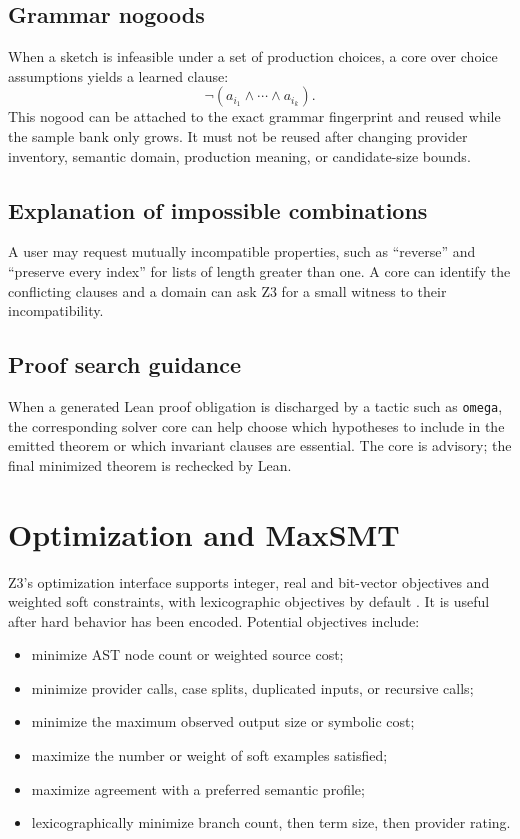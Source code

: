 \documentclass[11pt,oneside]{report}
\newcommand{\code}[1]{\texttt{#1}}
\begin{document}
\subsection{Grammar nogoods}

When a sketch is infeasible under a set of production choices, a core over choice assumptions yields a learned clause:
\[
  \neg(a_{i_1}\land\cdots\land a_{i_k}).
\]
This nogood can be attached to the exact grammar fingerprint and reused while the sample bank only grows. It must not be reused after changing provider inventory, semantic domain, production meaning, or candidate-size bounds.

\subsection{Explanation of impossible combinations}

A user may request mutually incompatible properties, such as ``reverse'' and ``preserve every index'' for lists of length greater than one. A core can identify the conflicting clauses and a domain can ask Z3 for a small witness to their incompatibility.

\subsection{Proof search guidance}

When a generated Lean proof obligation is discharged by a tactic such as \code{omega}, the corresponding solver core can help choose which hypotheses to include in the emitted theorem or which invariant clauses are essential. The core is advisory; the final minimized theorem is rechecked by Lean.

\section{Optimization and MaxSMT}

Z3's optimization interface supports integer, real and bit-vector objectives and weighted soft constraints, with lexicographic objectives by default \cite{z3-opt}. It is useful after hard behavior has been encoded. Potential objectives include:

\begin{itemize}[leftmargin=2em]
\item minimize AST node count or weighted source cost;
\item minimize provider calls, case splits, duplicated inputs, or recursive calls;
\item minimize the maximum observed output size or symbolic cost;
\item maximize the number or weight of soft examples satisfied;
\item maximize agreement with a preferred semantic profile;
\item lexicographically minimize branch count, then term size, then provider rating.
\end{itemize}
\end{document}
